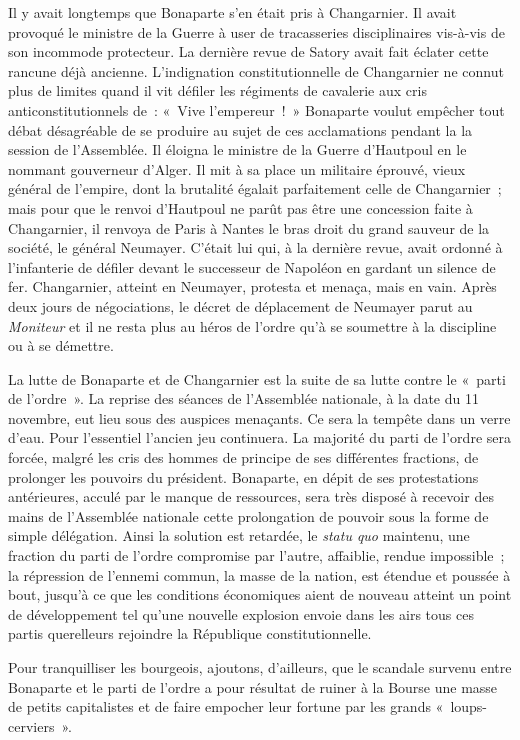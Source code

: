 \documentclass[twoside]{book} %
\newcommand\chapterclose{} %
\begin{document}
Il y avait longtemps que Bonaparte s’en était pris à Changarnier. Il avait provoqué le ministre de la Guerre à user de tracasseries disciplinaires vis-à-vis de son incommode protecteur. La dernière revue de Satory avait fait éclater cette rancune déjà ancienne. L’indignation constitutionnelle de Changarnier ne connut plus de limites quand il vit défiler les régiments de cavalerie aux cris anticonstitutionnels de : « Vive l’empereur ! » Bonaparte voulut empêcher tout débat désagréable de se produire au sujet de ces acclamations pendant la la session de l’Assemblée. Il éloigna le ministre de la Guerre d’Hautpoul en le nommant gouverneur d’Alger. Il mit à sa place un militaire éprouvé, vieux général de l’empire, dont la brutalité égalait parfaitement celle de Changarnier ; mais pour que le renvoi d’Hautpoul ne parût pas être une concession faite à Changarnier, il renvoya de Paris à Nantes le bras droit du grand sauveur de la société, le général Neumayer. C’était lui qui, à la dernière revue, avait ordonné à l’infanterie de défiler devant le successeur de Napoléon en gardant un silence de fer. Changarnier, atteint en Neumayer, protesta et menaça, mais en vain. Après deux jours de négociations, le décret de déplacement de Neumayer parut au \emph{Moniteur} et il ne resta plus au héros de l’ordre qu’à se soumettre à la discipline ou à se démettre.\par
La lutte de Bonaparte et de Changarnier est la suite de sa lutte contre le « parti de l’ordre ». La reprise des séances de l’Assemblée nationale, à la date du 11 novembre, eut lieu sous des auspices menaçants. Ce sera la tempête dans un verre d’eau. Pour l’essentiel l’ancien jeu continuera. La majorité du parti de l’ordre sera forcée, malgré les cris des hommes de principe de ses différentes fractions, de prolonger les pouvoirs du président. Bonaparte, en dépit de ses protestations antérieures, acculé par le manque de ressources, sera très disposé à recevoir des mains de l’Assemblée nationale cette prolongation de pouvoir sous la forme de simple délégation. Ainsi la solution est retardée, le \emph{statu quo} maintenu, une fraction du parti de l’ordre compromise par l’autre, affaiblie, rendue impossible ; la répression de l’ennemi commun, la masse de la nation, est étendue et poussée à bout, jusqu’à ce que les conditions économiques aient de nouveau atteint un point de développement tel qu’une nouvelle explosion envoie dans les airs tous ces partis querelleurs rejoindre la République constitutionnelle.\par
Pour tranquilliser les bourgeois, ajoutons, d’ailleurs, que le scandale survenu entre Bonaparte et le parti de l’ordre a pour résultat de ruiner à la Bourse une masse de petits capitalistes et de faire empocher leur fortune par les grands « loups-cerviers ».
\chapterclose
\end{document}
